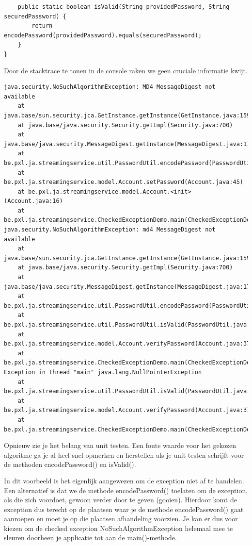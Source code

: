 \begin{itemize}
{\begin{lstlisting}
	public static boolean isValid(String providedPassword, String securedPassword) {
		return encodePassword(providedPassword).equals(securedPassword);
	}
}
\end{lstlisting}
 
Door de stacktrace te tonen in de console raken we geen cruciale informatie kwijt.

\begin{verbatim}
java.security.NoSuchAlgorithmException: MD4 MessageDigest not available
	at java.base/sun.security.jca.GetInstance.getInstance(GetInstance.java:159)
	at java.base/java.security.Security.getImpl(Security.java:700)
	at java.base/java.security.MessageDigest.getInstance(MessageDigest.java:177)
	at be.pxl.ja.streamingservice.util.PasswordUtil.encodePassword(PasswordUtil.java:15)
	at be.pxl.ja.streamingservice.model.Account.setPassword(Account.java:45)
	at be.pxl.ja.streamingservice.model.Account.<init>(Account.java:16)
	at be.pxl.ja.streamingservice.CheckedExceptionDemo.main(CheckedExceptionDemo.java:8)
java.security.NoSuchAlgorithmException: md4 MessageDigest not available
	at java.base/sun.security.jca.GetInstance.getInstance(GetInstance.java:159)
	at java.base/java.security.Security.getImpl(Security.java:700)
	at java.base/java.security.MessageDigest.getInstance(MessageDigest.java:177)
	at be.pxl.ja.streamingservice.util.PasswordUtil.encodePassword(PasswordUtil.java:15)
	at be.pxl.ja.streamingservice.util.PasswordUtil.isValid(PasswordUtil.java:25)
	at be.pxl.ja.streamingservice.model.Account.verifyPassword(Account.java:37)
	at be.pxl.ja.streamingservice.CheckedExceptionDemo.main(CheckedExceptionDemo.java:9)
Exception in thread "main" java.lang.NullPointerException
	at be.pxl.ja.streamingservice.util.PasswordUtil.isValid(PasswordUtil.java:25)
	at be.pxl.ja.streamingservice.model.Account.verifyPassword(Account.java:37)
	at be.pxl.ja.streamingservice.CheckedExceptionDemo.main(CheckedExceptionDemo.java:9)
\end{verbatim}

Opnieuw zie je het belang van unit testen. Een foute waarde voor het gekozen algoritme ga je al heel snel opmerken en herstellen als je unit testen schrijft voor de methoden encodePassword() en isValid().

In dit voorbeeld is het eigenlijk aangewezen om de exception niet af te handelen. Een alternatief is dat we de methode encodePassword() toelaten om de exception, als die zich voordoet, gewoon verder door te geven (gooien).
Hierdoor komt de exception dus terecht op de plaatsen waar je de methode encodePassword() gaat aanroepen en moet je op die plaatsen afhandeling voorzien. Je kan er dus voor kiezen om de checked exception NoSuchAlgorithmException helemaal mee te sleuren doorheen je applicatie tot aan de main()-methode.

}
\end{itemize}
